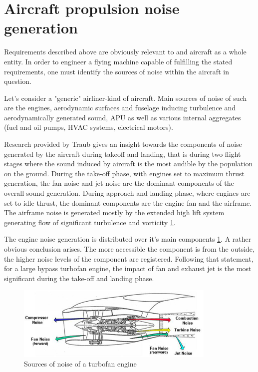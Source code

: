 \section{Aircraft propulsion noise generation}

Requirements described above are obviously relevant to and aircraft as a whole entity. In order to engineer a flying machine capable of fulfilling the stated requirements, one must identify the sources of noise within the aircraft in question.

Let's consider a "generic" airliner-kind of aircraft. Main sources of noise of such are the engines, aerodynamic surfaces and fuselage inducing turbulence and aerodynamically generated sound, APU as well as various internal aggregates (fuel and oil pumps, HVAC systems, electrical motors). 

Research provided by Traub \citep{traub} gives an insight towards the components of noise generated by the aircraft during takeoff and landing, that is during two flight stages where the sound induced by aircraft is the most audible by the population on the ground. During the take-off phase, with engines set to maximum thrust generation,  the fan noise and jet noise are the dominant components of the overall sound generation. During approach and landing phase, where engines are set to idle thrust, the dominant components are the engine fan and the airframe. The airframe noise is generated mostly by the extended high lift system generating flow of significant turbulence and vorticity \ref{traub1}.

The engine noise generation is distributed over it's main components \ref{traub1}. A rather obvious conclusion arises. The more accessible the component is from the outside, the higher noise levels of the component are registered. Following that statement, for a large bypass turbofan engine, the impact of fan and exhaust jet is the most significant during the take-off and landing phase.

\begin{figure}[h!]
\centering %
\includegraphics[width=0.85\textwidth]{Pictures/traub1.png}
\caption{Sources of noise of a turbofan engine \citep{traub}}
\label{traub1}
\end{figure}

